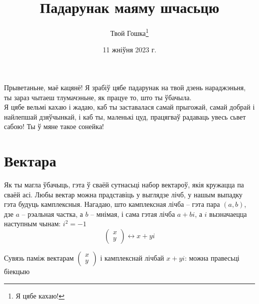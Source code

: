 \documentclass{article}
\title{Падарунак маяму шчасьцю}
\author{Твой Гошка\thanks{Я цябе кахаю!}}
\date{11 жніўня 2023 г.}
\newcommand{\rl}{\hspace*{5mm}}
\begin{document}
\maketitle
\begin{center}
    Прыветаньне, маё кацянё! Я зрабіў цябе падарунак на твой дзень нараджэньня, ты зараз чытаеш тлумачэньне, як працуе то, што ты ўбачыла. \\
    \vspace{3mm}
    Я цябе вельмі кахаю і жадаю, каб ты заставалася самай прыгожай, самай добрай і найлепшай дзяўчынкай, і каб ты, маленькі цуд, працягваў радаваць увесь сьвет сабою! Ты ў мяне такое сонейка!
\end{center}
\newpage
\section{Вектара}
\rl Як ты магла ўбачыць, гэта ў сваёй сутнасьці набор вектароў, якія кружацца па сваёй асі.
Любы вектар можна прадставіць у выглядзе лічб, у нашым выпадку гэта будуць камплексныя.
Нагадаю, што камплексная лічба \--- гэта пара $(a, b)$, дзе $a$ \--- рэальная частка, а $b$ \--- мнімая, і сама гэтая лічба $a + bi$,
а $i$ вызначаецца наступным чынам: $i^2 = -1$
\[ \begin{pmatrix} x \\ y \end{pmatrix} \leftrightarrow x + yi \]
\begin{center}
    \scriptsize Сувязь паміж вектарам $\begin{pmatrix} x \\ y \end{pmatrix}$ і камплекснай лічбай $x + yi$: можна правесьці біекцыю
\end{center}
\end{document}
